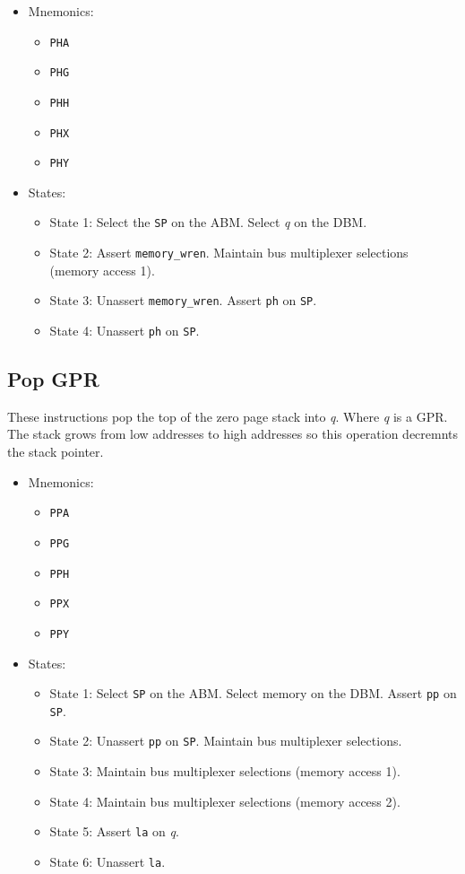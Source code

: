 \documentclass[a4paper,12pt]{article}
\newcommand{\SP}{\texttt{SP}}
\newcommand{\qq}{\textit{q}}
\begin{document}
\begin{itemize}
\item Mnemonics:
\begin{itemize}
	\item \texttt{PHA}
	\item \texttt{PHG}
	\item \texttt{PHH}
	\item \texttt{PHX}
	\item \texttt{PHY}
\end{itemize}
\item States:
\begin{itemize}
	\item State 1: Select the \SP{} on the ABM. Select \qq{} on the DBM.
	\item State 2: Assert \texttt{memory\_wren}. Maintain bus multiplexer
	selections (memory access 1).
	\item State 3: Unassert \texttt{memory\_wren}. Assert \texttt{ph} on 
	\SP{}. 
	\item State 4: Unassert \texttt{ph} on \SP{}.
\end{itemize}
\end{itemize}

\subsection{Pop GPR}
These instructions pop the top of the zero page stack into \qq{}. Where \qq{}
is a GPR. The stack grows from low addresses to high addresses so this 
operation decremnts the stack pointer.
\par

\begin{itemize}
\item Mnemonics:
\begin{itemize}
	\item \texttt{PPA}
	\item \texttt{PPG}
	\item \texttt{PPH}
	\item \texttt{PPX}
	\item \texttt{PPY}
\end{itemize}
\item States: 
\begin{itemize}
	\item State 1: Select \SP{} on the ABM. Select memory on the DBM.
	Assert \texttt{pp} on \SP{}.
	\item State 2: Unassert \texttt{pp} on \SP{}. Maintain bus multiplexer
	selections.
	\item State 3: Maintain bus multiplexer selections (memory access 1).
	\item State 4: Maintain bus multiplexer selections (memory access 2).
	\item State 5: Assert \texttt{la} on \qq{}.
	\item State 6: Unassert \texttt{la}.
\end{itemize}
\end{itemize}
\end{document}
